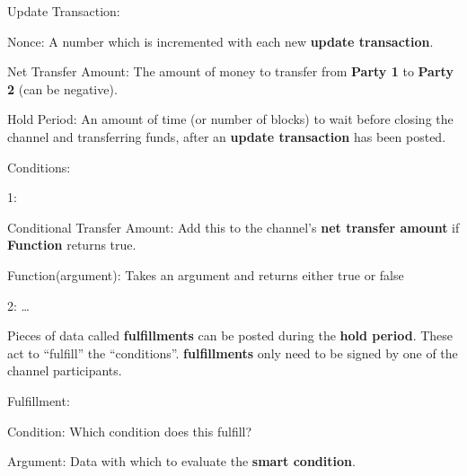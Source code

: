 \documentclass[a4paper]{article}
\newcommand{\bgls}[1]{\textbf{\gls{#1}}}
\newcommand{\bglspl}[1]{\textbf{\glspl{#1}}}
\newenvironment{mydescription}
{\begin{description}
\setlength{\itemsep}{5pt}
  \setlength{\parskip}{0pt}
  \setlength{\labelsep}{5pt}
}{
\end{description}}
\begin{document}
\begin{mdframed}[style=message]
\begin{mydescription}
\item[Update Transaction:] \hfill
  \item[Nonce:] A number which is incremented with each new \bgls{update transaction}.
  \item[Net Transfer Amount:] The amount of money to transfer from \textbf{Party 1} to \textbf{Party 2} (can be negative).
  \item[Hold Period:] An amount of time (or number of blocks) to wait before closing the channel and transferring funds, after an \bgls{update transaction} has been posted.
  \begin{mydescription}
  \item[Conditions:] \hfill
    \begin{mydescription}
    \item[1:] \hfill
      \begin{mydescription}
      \item[Conditional Transfer Amount:] Add this to the channel's \bgls{net transfer amount} if \textbf{Function} returns true.
      \item[Function(argument):] Takes an argument and returns either true or false
      \end{mydescription}
    \item[2:] \ldots
    \end{mydescription}
  \end{mydescription}
\end{mydescription}
\end{mdframed}

Pieces of data called \bglspl{fulfillment} can be posted during the \bgls{hold period}. These act to ``fulfill'' the ``conditions''. \bglspl{fulfillment} only need to be signed by one of the channel participants.

\begin{mdframed}[style=message]
\begin{mydescription}
\item[Fulfillment:] \hfill
  \begin{mydescription}
  \item[Condition:] Which condition does this fulfill?
  \item[Argument:] Data with which to evaluate the \bgls{smart condition}.
  \end{mydescription}
\end{mydescription}
\end{mdframed}
\end{document}
